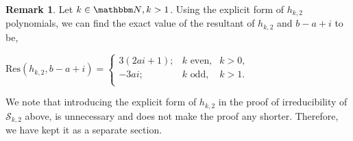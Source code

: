 \documentclass[reqno]{amsart}
\numberwithin{equation}{section}
\theoremstyle{plain}
\theoremstyle{definition}
\newtheorem{remark}[theorem]{Remark}
\theoremstyle{definition}
\newcommand{\N}{{\mathbbm N}}
\begin{document}
\begin{remark}
    Let $k\in \N, k>1$. Using the explicit form of $h_{k,2}$ polynomials, we can find the exact value of the resultant of $h_{k,2}$ and $b-a+i$ to be, 
    \begin{center}
            $\mbox{Res}(h_{k,2},b-a+i)= \left\{ \begin{array}{rcl}
                3(2ai+1); & k \mbox{ even,} & k>0, \\ -3ai; & k \mbox{ odd,} & k>1. \\
            \end{array}\right.$
        \end{center}
    We note that introducing the explicit form of $h_{k,2}$ in the proof of irreducibility of $\mathscr{S}_{k,2}$ above, is unnecessary and does not make the proof any shorter. Therefore, we have kept it as a separate section. 
\end{remark}
\end{document}
